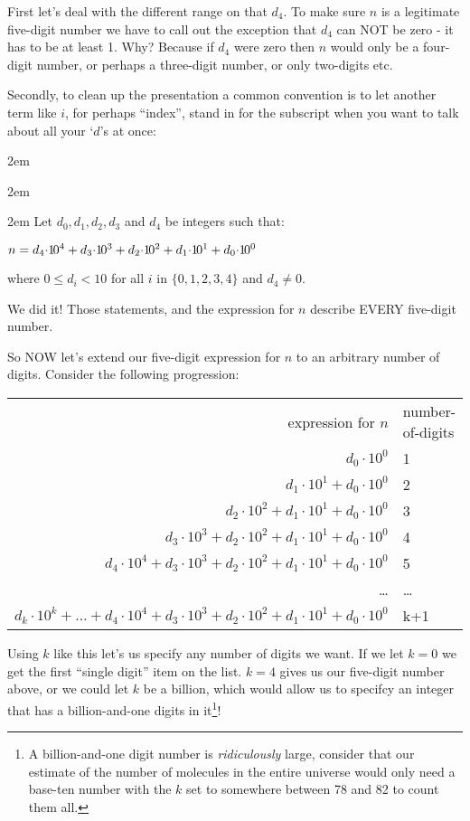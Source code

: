 \documentclass{article}
\newenvironment{jprIn}{\begin{adjustwidth}{2em}{}}{\end{adjustwidth}}
\begin{document}
First let's deal with the different range on that $d_4$. To make sure $n$ is a legitimate five-digit number we have to
call out the exception that $d_4$ can NOT be zero - it has to be at least 1.
Why? Because if $d_4$ were zero then $n$ would only be a
four-digit number, or perhaps a three-digit number, or only two-digits etc.

Secondly, to clean up the presentation
a common convention
is to let another term like $i$, for perhaps ``index'', stand in for the subscript
when you want to talk about all your `$d$'s at once:
\begin{jprIn}
\begin{jprIn}
\begin{jprIn}
Let $d_0, d_1, d_2,d_3$ and $d_4$ be integers such that:

\hspace{3em}$n=d_4{\cdot}{1\hspace{-0.12em}0}^4+d_3{\cdot}{1\hspace{-0.12em}0}^3+d_2{\cdot}{1\hspace{-0.12em}0}^2+d_1{\cdot}{1\hspace{-0.12em}0}^1+d_0{\cdot}{1\hspace{-0.12em}0}^0$

where $0\le{}d_i<10$ for all $i$ in $\{0,1,2,3,4\}$ and $d_4\ne0$.
\end{jprIn}
\end{jprIn}
\end{jprIn}
We did it! Those statements, and the expression for $n$ describe EVERY five-digit number.

So NOW let's extend
our five-digit expression for $n$ to an arbitrary
number of digits.
Consider the following progression:
\begin{center}
\begin{tabular}{r l}
expression for $n$ & number-of-digits\\
$d_0{\cdot}10^0$ & 1\\
$d_1{\cdot}10^1+d_0{\cdot}10^0$ & 2\\
$d_2{\cdot}10^2+d_1{\cdot}10^1+d_0{\cdot}10^0$ & 3\\
$d_3{\cdot}10^3+d_2{\cdot}10^2+d_1{\cdot}10^1+d_0{\cdot}10^0$ & 4\\
$d_4{\cdot}10^4+d_3{\cdot}10^3+d_2{\cdot}10^2+d_1{\cdot}10^1+d_0{\cdot}10^0$ & 5\\
\dots{} & \dots{}\\
$d_k{\cdot}10^k+\dots{}+d_4{\cdot}10^4+d_3{\cdot}10^3+d_2{\cdot}10^2+d_1{\cdot}10^1+d_0{\cdot}10^0$ & k+1
\end{tabular}
\end{center}
Using $k$ like this let's us specify any number of digits we want.
If we let $k=0$ we get the first ``single digit'' 
item on the list.  $k=4$ gives us our five-digit number above,
or we could let $k$ be a billion, which would allow
us to specifcy an integer that has a billion-and-one
digits in it\footnote{A billion-and-one digit number is 
\emph{ridiculously} large,
consider that our estimate of the number of molecules in
the entire universe would only need a base-ten
number with the $k$ set to somewhere between 78 and 82 to count them all.}!
\end{document}
